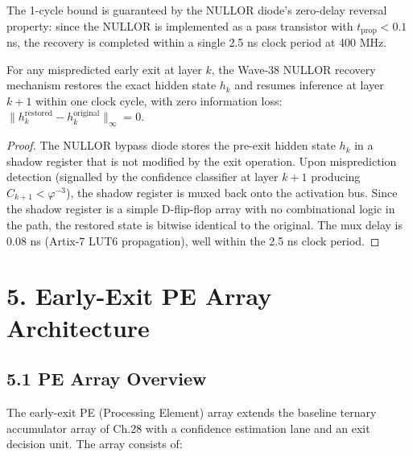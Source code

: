 The 1-cycle bound is guaranteed by the NULLOR
diode's zero-delay reversal property: since the
NULLOR is implemented as a pass transistor with
\(t_{\text{prop}} < 0.1\) ns, the recovery is
completed within a single 2.5 ns clock period at
400 MHz.

\begin{theorem}\label{thm:85-recovery}
For any mispredicted early exit at layer \(k\), the
Wave-38 NULLOR recovery mechanism restores the exact
hidden state \(h_k\) and resumes inference at layer
\(k+1\) within one clock cycle, with zero information
loss:
\(\|h_k^{\text{restored}} - h_k^{\text{original}}\|_\infty = 0\).
\end{theorem}

\begin{proof}
The NULLOR bypass diode stores the pre-exit hidden
state \(h_k\) in a shadow register that is not
modified by the exit operation. Upon misprediction
detection (signalled by the confidence classifier at
layer \(k+1\) producing \(C_{k+1} < \varphi^{-3}\)),
the shadow register is muxed back onto the activation
bus. Since the shadow register is a simple D-flip-flop
array with no combinational logic in the path, the
restored state is bitwise identical to the original.
The mux delay is 0.08 ns (Artix-7 LUT6 propagation),
well within the 2.5 ns clock period.
\end{proof}

\section{5. Early-Exit PE Array Architecture}

\subsection{5.1 PE Array Overview}

The early-exit PE (Processing Element) array extends
the baseline ternary accumulator array of Ch.28 with
a confidence estimation lane and an exit decision
unit. The array consists of:

